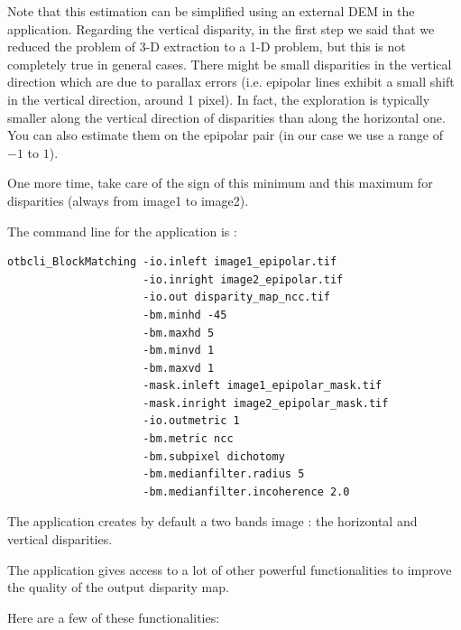 Note that this estimation can be simplified using an external DEM in the
 application. Regarding the
vertical disparity, in the first step we said that we reduced the
problem of 3-D extraction to a 1-D problem, but this is not completely
true in general cases. There might be small disparities in the
vertical direction which are due to parallax errors (i.e. epipolar
lines exhibit a small shift in the vertical direction, around 1
pixel). In fact, the exploration is typically smaller along the
vertical direction of disparities than along the horizontal one. You
can also estimate them on the epipolar pair (in our case we use a
range of $-1$ to $1$).

One more time, take care of the sign of this minimum and this maximum for
disparities (always from image1 to image2).

The command line for the  application is :
\begin{verbatim}
otbcli_BlockMatching -io.inleft image1_epipolar.tif
                     -io.inright image2_epipolar.tif
                     -io.out disparity_map_ncc.tif
                     -bm.minhd -45
                     -bm.maxhd 5
                     -bm.minvd 1
                     -bm.maxvd 1
                     -mask.inleft image1_epipolar_mask.tif
                     -mask.inright image2_epipolar_mask.tif
                     -io.outmetric 1
                     -bm.metric ncc
                     -bm.subpixel dichotomy
                     -bm.medianfilter.radius 5
                     -bm.medianfilter.incoherence 2.0
\end{verbatim}

The application creates by default a two bands image : the horizontal and
vertical disparities.

The  application gives access to a lot of other
powerful functionalities to improve the quality of the output disparity map.

Here are a few of these functionalities:

